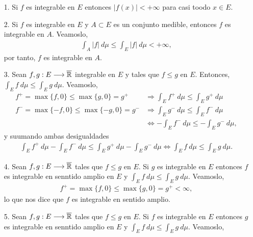 \begin{obs}
    \begin{enumerate}
        \item[1.] Si $f$ es integrable en $E$ entonces $|f(x)| < +\infty$ para casi toodo $x \in E$.
        \item[2.] Si $f$ es integrable en $E$ y $A \subset E$ es un conjunto medible, entonces $f$ es integrable en $A$. Veamoslo,
              \begin{align*}
                  \int_{A}{|f| \ d\mu} \leq \int_{E}{|f| \ d\mu} < +\infty,
              \end{align*}
              por tanto, $f$ es integrable en $A$.
        \item[3.] Sean $f,g: E \longrightarrow \overline{\mathbb{R}}$ integrable en $E$ y tales que $f \leq g$ en $E$. Entonces, $\int_{E}{f \ d\mu} \leq \int_{E}{g \ d\mu}$. Veamoslo,
              \begin{align*}
                  f^+ = \max\{f,0\} \leq \max\{g,0\} = g^+   & \Longrightarrow \int_{E}{f^+ \ d\mu} \leq \int_{E}{g^+ \ d\mu}        \\
                  f^- = \max\{-f,0\} \leq \max\{-g,0\} = g^- & \Longrightarrow \int_{E}{g^- \ d\mu} \leq \int_{E}{f^- \ d\mu}        \\
                                                             & \Longleftrightarrow -\int_{E}{f^- \ d\mu} \leq -\int_{E}{g^- \ d\mu},
              \end{align*}
              y suumando ambas desigualdades
              \begin{align*}
                  \int_{E}{f^+ \ d\mu} - \int_{E}{f^- \ d\mu} \leq \int_{E}{g^+ \ d\mu} - \int_{E}{g^- \ d\mu} \Longleftrightarrow \int_{E}{f \ d\mu} \leq \int_{E}{g \ d\mu}.
              \end{align*}
        \item[4.] Sean $f,g: E \longrightarrow \overline{\mathbb{R}}$ tales que $f \leq g$ en $E$. Si $g$ es integrable en $E$ entonces $f$ es integrable en senntido amplio en $E$ y $\int_{E}{f \ d\mu} \leq \int_{E}{g \ d\mu}$. Veamoslo,
              \begin{align*}
                  f^+ = \max\{f,0\} \leq \max\{g,0\} = g^+ < \infty,
              \end{align*}
              lo que nos dice que $f$ es integrable en sentido amplio.
        \item[5.] Sean $f,g: E \longrightarrow \overline{\mathbb{R}}$ tales que $f \leq g$ en $E$. Si $f$ es integrable en $E$ entonces $g$ es integrable en senntido amplio en $E$ y $\int_{E}{f \ d\mu} \leq \int_{E}{g \ d\mu}$. Veamoslo,

\end{enumerate}
\end{obs}
